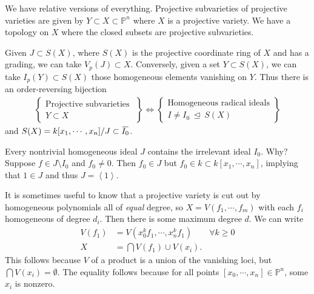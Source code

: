 \begin{remark}

We have relative versions of everything. Projective subvarieties of
projective varieties are given by \(Y\subset X\subset {\mathbb{P}}^n\)
where \(X\) is a projective variety. We have a topology on \(X\) where
the closed subsets are projective subvarieties.

\end{remark}

\begin{remark}

Given \(J\subset S(X)\), where \(S(X)\) is the projective coordinate
ring of \(X\) and has a grading, we can take \(V_p(J) \subset X\).
Conversely, given a set \(Y\subset S(X)\), we can take
\(I_p(Y) \subset S(X)\) those homogeneous elements vanishing on \(Y\).
Thus there is an order-reversing bijection
\begin{align*}  
\left\{{\substack{\text{Projective subvarieties } \\ Y\subset X}}\right\}
\iff
\left\{{\substack{\text{Homogeneous radical ideals} \\ I \neq I_0 {~\trianglelefteq~}S(X)}}\right\}
\end{align*}
and
\(S(X) = k[x_1, \cdots, x_{n}]/J \subset \mkern 1.5mu\overline{\mkern-1.5muI_0\mkern-1.5mu}\mkern 1.5mu\).

\end{remark}

\begin{remark}

Every nontrivial homogeneous ideal \(J\) contains the irrelevant ideal
\(I_0\). Why? Suppose \(f\in J\setminus I_0\) and \(f_0\neq 0\). Then
\(f_0\in J\) but \(f_0\in k\subset k[x_1, \cdots, x_{n}]\), implying
that \(1\in J\) and thus \(J = \left\langle{1}\right\rangle\).

\end{remark}


\begin{remark}

It is sometimes useful to know that a projective variety is cut out by
homogeneous polynomials all of \emph{equal} degree, so
\(X = V (f_1, \cdots, f_m)\) with each \(f_i\) homogeneous of degree
\(d_i\). Then there is some maximum degree \(d\). We can write
\begin{align*}  
V(f_1) &= V(x_0^k f_1, \cdots, x_n^k f_1 ) \qquad \forall k\geq 0 \\
X &= \bigcap V(f_1) \cup V(x_i)
.\end{align*}
This follows because \(V\) of a product is a union of the vanishing
loci, but \(\bigcap V(x_i) = \emptyset\). The equality follows because
for all points
\({\left[ {x_0, \cdots, x_n} \right]} \in {\mathbb{P}}^n\), some \(x_i\)
is nonzero.

\end{remark}

